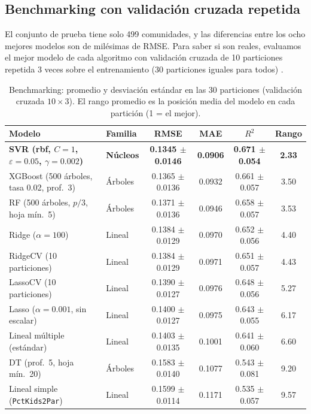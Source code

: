 \documentclass[11pt,a4paper]{article}
\let\citepOriginal\citep
\renewcommand*{\citep}[1]{\textbf{\citepOriginal{#1}}}%
\begin{document}
\subsection{Benchmarking con validación cruzada repetida}
El conjunto de prueba tiene solo 499 comunidades, y las diferencias entre los ocho mejores modelos son de milésimas de RMSE. Para saber si son reales, evaluamos el mejor modelo de cada algoritmo con validación cruzada de 10 particiones repetida 3 veces sobre el entrenamiento (30 particiones iguales para todos) \citep{hothorn2005,kohavi1995}.

\begin{table}[H]
\centering
\small
\caption{Benchmarking: promedio y desviación estándar en las 30 particiones (validación cruzada $10\times3$). El rango promedio es la posición media del modelo en cada partición (1 = el mejor).}
\setlength{\tabcolsep}{4pt}
\begin{tabular}{>{\raggedright\arraybackslash}p{5.6cm}lcccc}
\toprule
Modelo & Familia & RMSE & MAE & $R^2$ & Rango \\
\midrule
\textbf{SVR (rbf, $C=1$, $\varepsilon=0.05$, $\gamma=0.002$)} & \textbf{Núcleos} & \textbf{0.1345 $\pm$ 0.0146} & \textbf{0.0906} & \textbf{0.671 $\pm$ 0.054} & \textbf{2.33} \\
XGBoost (500 árboles, tasa 0.02, prof.\ 3) & Árboles & 0.1365 $\pm$ 0.0136 & 0.0932 & 0.661 $\pm$ 0.057 & 3.50 \\
RF (500 árboles, $p/3$, hoja mín.\ 5) & Árboles & 0.1371 $\pm$ 0.0136 & 0.0946 & 0.658 $\pm$ 0.057 & 3.53 \\
Ridge ($\alpha=100$) & Lineal & 0.1384 $\pm$ 0.0129 & 0.0970 & 0.652 $\pm$ 0.056 & 4.40 \\
RidgeCV (10 particiones) & Lineal & 0.1384 $\pm$ 0.0129 & 0.0971 & 0.651 $\pm$ 0.057 & 4.43 \\
LassoCV (10 particiones) & Lineal & 0.1390 $\pm$ 0.0127 & 0.0976 & 0.648 $\pm$ 0.056 & 5.27 \\
Lasso ($\alpha=0.001$, sin escalar) & Lineal & 0.1400 $\pm$ 0.0127 & 0.0975 & 0.643 $\pm$ 0.055 & 6.17 \\
Lineal múltiple (estándar) & Lineal & 0.1403 $\pm$ 0.0135 & 0.1001 & 0.641 $\pm$ 0.060 & 6.60 \\
DT (prof.\ 5, hoja mín.\ 20) & Árboles & 0.1583 $\pm$ 0.0140 & 0.1077 & 0.543 $\pm$ 0.081 & 9.20 \\
Lineal simple (\texttt{PctKids2Par}) & Lineal & 0.1599 $\pm$ 0.0114 & 0.1171 & 0.535 $\pm$ 0.057 & 9.57 \\
\bottomrule
\end{tabular}
\end{table}
\end{document}
